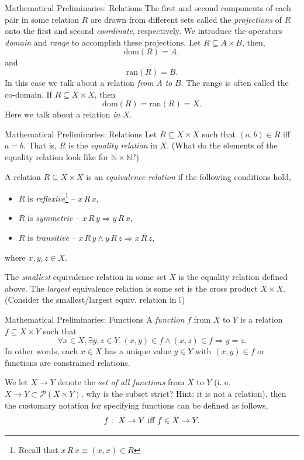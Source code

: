 \documentclass{beamer}
\begin{document}
\begin{frame}{\large Mathematical  Preliminaries: Relations}
The first and second components of each pair in some relation $R$ are drawn from different sets called
the {\em projections} of $R$ onto the first and second {\em coordinate}, respectively.  We introduce
the operators {\em domain} and {\em range} to accomplish these projections.  Let $R\subseteq A\times B$,
then,
\[
\mbox{dom}(R) = A,
\]
and
\[
\mbox{ran}(R) = B.
\]
In this case we talk about a relation {\em from} $A$ {\em to} $B$.  The range is often
called the co-domain. If $R\subseteq X\times X$, then
\[
\mbox{dom}(R) = \mbox{ran}(R) = X.
\]
Here we talk about a relation {\em in} $X$.
\end{frame}

\begin{frame}{\large Mathematical  Preliminaries: Relations}
Let $R \subseteq X\times X$ such that $(a,b)\in R$ iff $a=b$.  That is, $R$ is the {\em equality relation}
in  $X$. (What do the elements of the equality relation look like for $\mathbb{N}\times\mathbb{N}$?)

\vspace{.1in}

A relation $R\subseteq X\times X$ is an {\em equivalence relation} if the following conditions hold,
\begin{itemize}
\item $R$ is {\em reflexive}\footnote{Recall that $x\, R\, x \equiv (x,x)\in R$} -- $x\, R\, x$,
\item $R$ is {\em symmetric} -- $x\, R\, y \Rightarrow y\, R\, x$,
\item $R$ is {\em transitive} -- $x\, R\, y \wedge y\, R\, z \Rightarrow x\, R\, z$,
\end{itemize}
where $x,y,z \in X$.

\vspace{.1in}

The {\em smallest} equivalence relation in some set $X$ is the equality relation defined above.
The {\em largest} equivalence relation is some set is the cross product $X\times X$. (Consider the 
smallest/largest equiv. relation in $\mathbb I$)
\end{frame}

\begin{frame}{\large Mathematical  Preliminaries: Functions}
A {\em function} $f$ from $X$ to $Y$ is a relation $f \subseteq X\times Y$ such that
\[
\forall x\in X, \exists y,z\in Y.\, (x,y)\in f \wedge (x,z)\in f \Rightarrow y = z.
\]
In other words, each $x\in X$ has a unique value $y\in Y$ with $(x,y)\in f$ or functions are constrained relations.

\vspace{.1in}

We let $X \rightarrow Y$ denote the {\em set of all functions} from $X$ to $Y$
(i. e. $X \rightarrow Y \subset {\mathcal P}(X\times Y)$, why is the subset strict? Hint: it is not a relation), then the customary notation
for specifying functions can be defined as follows,
\[
f\,\colon\; X \rightarrow Y \mbox{ iff } f\in X\rightarrow Y.
\]
\end{frame}
\end{document}
